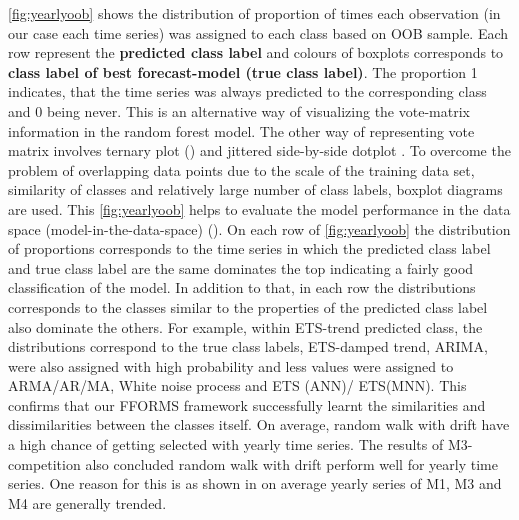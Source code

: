 \documentclass[11pt,a4paper,]{article}
\begin{document}
\autoref{fig:yearlyoob} shows the distribution of proportion of times
each observation (in our case each time series) was assigned to each
class based on OOB sample. Each row represent the \textbf{predicted
class label} and colours of boxplots corresponds to \textbf{class label
of best forecast-model (true class label)}. The proportion 1 indicates,
that the time series was always predicted to the corresponding class and
0 being never. This is an alternative way of visualizing the vote-matrix
information in the random forest model. The other way of representing
vote matrix involves ternary plot (\textcite{sutherland2000orca}) and
jittered side-by-side dotplot
\autocites{ehrlinger2015ggrandomforests}{da2017interactive}. To overcome
the problem of overlapping data points due to the scale of the training
data set, similarity of classes and relatively large number of class
labels, boxplot diagrams are used. This \autoref{fig:yearlyoob} helps to
evaluate the model performance in the data space
(model-in-the-data-space) (\textcite{da2017interactive}). On each row of
\autoref{fig:yearlyoob} the distribution of proportions corresponds to
the time series in which the predicted class label and true class label
are the same dominates the top indicating a fairly good classification
of the model. In addition to that, in each row the distributions
corresponds to the classes similar to the properties of the predicted
class label also dominate the others. For example, within ETS-trend
predicted class, the distributions correspond to the true class labels,
ETS-damped trend, ARIMA, were also assigned with high probability and
less values were assigned to ARMA/AR/MA, White noise process and ETS
(ANN)/ ETS(MNN). This confirms that our FFORMS framework successfully
learnt the similarities and dissimilarities between the classes itself.
On average, random walk with drift have a high chance of getting
selected with yearly time series. The results of M3-competition also
concluded random walk with drift perform well for yearly time series.
One reason for this is as shown in \textcite{kang2018efficient} on
average yearly series of M1, M3 and M4 are generally trended.
\end{document}
